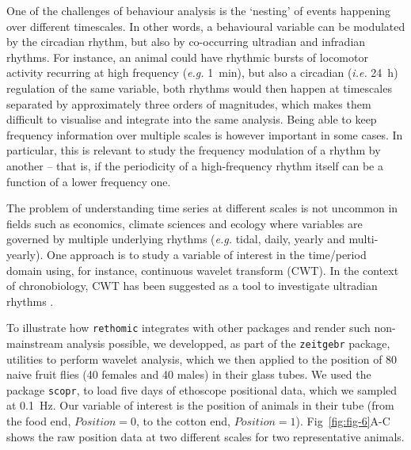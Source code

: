 \documentclass[10pt,letterpaper]{article}\usepackage[]{graphicx}\usepackage[]{color}
\begin{document}
One of the challenges of behaviour analysis is the `nesting' of events happening over different timescales.
In other words, a behavioural variable can be modulated by the circadian rhythm, but also by co-occurring ultradian and infradian rhythms.
For instance, an animal could have rhythmic bursts of locomotor activity recurring at high frequency (\emph{e.g.} 1~min), but also a circadian (\emph{i.e.} 24~h) regulation of the same variable,
both rhythms would then happen at timescales separated by approximately three orders of magnitudes, which makes them difficult to visualise and integrate into the same analysis.
Being able to keep frequency information over multiple scales is however important in some cases.
In particular, this is relevant to study the frequency modulation of a rhythm by another --
that is, if the periodicity of a high-frequency rhythm itself can be a function of a lower frequency one.

The problem of understanding time series at different scales is not uncommon in fields such as economics\cite{aguiar-conraria_business_2011}, climate sciences\cite{lau_climate_1995} and ecology\cite{cazelles_wavelet_2008} where variables are governed by multiple underlying rhythms (\emph{e.g.} tidal, daily, yearly and multi-yearly).
One approach is to study a variable of interest in the time/period domain using, for instance, continuous wavelet transform (CWT)\cite{grossmann_decomposition_1984}.
In the context of chronobiology, CWT has been suggested as a tool to investigate ultradian rhythms \cite{leise_wavelet_2013}.

To illustrate how \texttt{rethomic} integrates with other packages and render such non-mainstream analysis possible, 
we developped, as part of the \texttt{zeitgebr} package, utilities to perform wavelet analysis, which we then applied to the position of 80 naive fruit flies (40 females and 40 males) in their glass tubes.
We used the package \texttt{scopr}, to load five days of ethoscope positional data, which we sampled at 0.1~Hz.
Our variable of interest is the position of animals in their tube (from the food end, $Position = 0$,  to the cotton end, $Position = 1$).
Fig~\ref{fig:fig-6}A-C shows the raw position data at two different scales for two representative animals.
\end{document}
